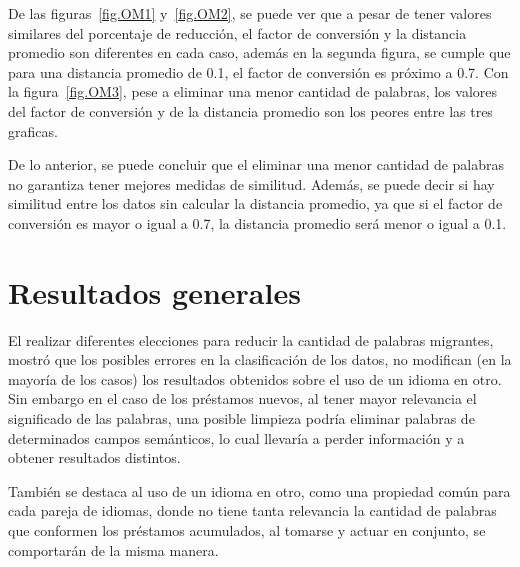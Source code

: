 De las figuras~\ref{fig.OM1} y~\ref{fig.OM2}, se puede ver que a pesar de tener valores similares del porcentaje de reducción, el factor de conversión y la distancia promedio son diferentes en cada caso, además en la segunda figura,  se cumple que para una distancia promedio de 0.1, el factor de conversión es próximo a 0.7. Con la figura~\ref{fig.OM3}, pese a eliminar una menor cantidad de palabras, los valores del factor de conversión y de la distancia promedio son los peores entre las tres graficas. 

De lo anterior, se puede concluir que el eliminar una menor cantidad de palabras no garantiza tener mejores medidas de similitud. Además, se puede decir si hay similitud entre los datos sin calcular la distancia promedio, ya que si el factor de conversión es mayor o igual a 0.7, la distancia promedio será menor o igual a 0.1. 

\section{Resultados generales}

El realizar diferentes elecciones para reducir la cantidad de palabras migrantes, mostró que los posibles errores en la clasificación de los datos, no modifican (en la mayoría de los casos) los resultados obtenidos sobre el uso de un idioma en otro. Sin embargo en el caso de los préstamos nuevos, al tener mayor relevancia el significado de las palabras, una posible limpieza podría eliminar palabras de determinados campos semánticos, lo cual llevaría a perder información y a obtener resultados distintos. 

También se destaca al uso de un idioma en otro, como una propiedad común para cada pareja de idiomas, donde no tiene tanta relevancia la cantidad de palabras que conformen los préstamos acumulados,   al tomarse y actuar  en conjunto,  se comportarán de la misma manera. 




